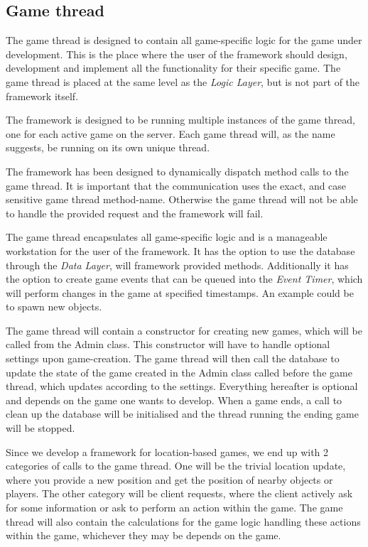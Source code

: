 \subsection{Game thread}\label{designgamethread}
The game thread is designed to contain all game-specific logic for the game under development. This is the place where the user of the framework should design, development and implement all the functionality for their specific game. The game thread is placed at the same level as the \textit{Logic Layer}, but is not part of the framework itself. 

The framework is designed to be running multiple instances of the game thread, one for each active game on the server. Each game thread will, as the name suggests, be running on its own unique thread. 

The framework has been designed to dynamically dispatch method calls to the game thread. It is important that the communication uses the exact, and case sensitive game thread method-name. Otherwise the game thread will not be able to handle the provided request and the framework will fail. 

The game thread encapsulates all game-specific logic and is a manageable workstation for the user of the framework. It has the option to use the database through the \textit{Data Layer}, will framework provided methods. Additionally it has the option to create game events that can be queued into the \textit{Event Timer}, which will perform changes in the game at specified timestamps. An example could be to spawn new objects.

The game thread will contain a constructor for creating new games, which will be called from the Admin class. This constructor will have to handle optional settings upon game-creation. The game thread will then call the database to update the state of the game created in the Admin class called before the game thread, which updates according to the settings. Everything hereafter is optional and depends on the game one wants to develop. When a game ends, a call to clean up the database will be initialised and the thread running the ending game will be stopped.

Since we develop a framework for location-based games, we end up with 2 categories of calls to the game thread. One will be the trivial location update, where you provide a new position and get the position of nearby objects or players. The other category will be client requests, where the client actively ask for some information or ask to perform an action within the game. The game thread will also contain the calculations for the game logic handling these actions within the game, whichever they may be depends on the game. 